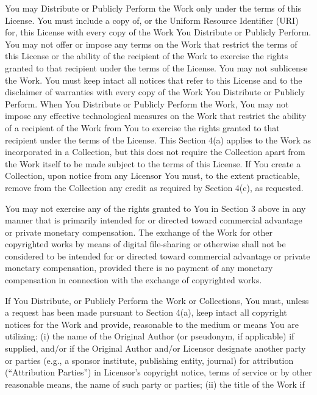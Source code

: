 \begin{doclicense@enumerate}
\item You may Distribute or Publicly Perform the Work only
under the terms of this License. You must include a copy
of, or the Uniform Resource Identifier (URI) for, this
License with every copy of the Work You Distribute or
Publicly Perform. You may not offer or impose any terms
on the Work that restrict the terms of this License or
the ability of the recipient of the Work to exercise the
rights granted to that recipient under the terms of the
License. You may not sublicense the Work. You must keep
intact all notices that refer to this License and to the
disclaimer of warranties with every copy of the Work You
Distribute or Publicly Perform. When You Distribute or
Publicly Perform the Work, You may not impose any
effective technological measures on the Work that
restrict the ability of a recipient of the Work from You
to exercise the rights granted to that recipient under
the terms of the License. This Section 4(a) applies to
the Work as incorporated in a Collection, but this does
not require the Collection apart from the Work itself to
be made subject to the terms of this License. If You
create a Collection, upon notice from any Licensor You
must, to the extent practicable, remove from the
Collection any credit as required by Section 4(c), as
requested.
\item You may not exercise any of the rights granted to You
in Section 3 above in any manner that is primarily
intended for or directed toward commercial advantage or
private monetary compensation. The exchange of the Work
 for other copyrighted works by means of digital
file-sharing or otherwise shall not be considered to be
intended for or directed toward commercial advantage or
private monetary compensation, provided there is no
payment of any monetary compensation in connection with
the exchange of copyrighted works.
\item If You Distribute, or Publicly Perform the Work or
Collections, You must, unless a request has been made
pursuant to Section 4(a), keep intact all copyright
notices for the Work and provide, reasonable to the
medium or means You are utilizing: (i) the name of the
Original Author (or pseudonym, if applicable) if
supplied, and/or if the Original Author and/or Licensor
designate another party or parties (e.g., a sponsor
institute, publishing entity, journal) for attribution
(``Attribution Parties'') in Licensor's copyright notice,
terms of service or by other reasonable means, the name
of such party or parties; (ii) the title of the Work if

\end{doclicense@enumerate}
